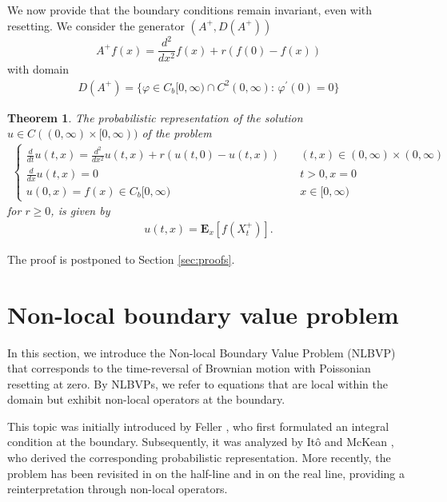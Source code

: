 \documentclass[11pt,a4paper]{article}
\newtheorem{theorem}{Theorem}
\theoremstyle{definition}
\theoremstyle{remark}
\newtheorem{remark}{Remark}
\begin{document}
We now provide that the boundary conditions remain invariant, even with resetting. We consider the generator $(A^+, {D}(A^+))$
\[
A^+f(x)= \frac{d^2}{dx^2} f(x) + r (f(0) - f(x))\]
with domain
\begin{align}
	\label{DomA}
	{D}(A^+)=\big\{\varphi \in C_b[0,\infty) \cap C^2(0,\infty):\, \varphi^\prime (0)=0 \big\}
\end{align}
\begin{theorem}
	\label{thm:resetting-refl}
	The probabilistic representation of the solution $u \in C((0,\infty) \times [0,\infty))$ of the problem
	\begin{align*}
		\begin{cases}
			\frac{d}{d t} u(t,x)=\frac{d^2}{dx^2} u(t,x) + r (u(t,0) - u(t,x)) \quad &(t,x) \in (0,\infty) \times (0,\infty) \\
			\frac{d}{dx} u(t,x) = 0 \quad    &t>0, x=0\\
			u(0,x) =f(x) \in C_b[0,\infty) \quad &x \in [0,\infty)
		\end{cases}
	\end{align*}
	for $r\geq 0$, is given by
	\begin{align*}
		u(t,x)=\mathbf{E}_x[f (X_t^+)].
	\end{align*}
\end{theorem}
\noindent
The proof is postponed to Section \ref{sec:proofs}.
\section{Non-local boundary value problem}
In this section, we introduce the Non-local Boundary Value Problem (NLBVP) that corresponds to the time-reversal of Brownian motion with Poissonian resetting at zero. By NLBVPs, we refer to equations that are local within the domain but exhibit non-local operators at the boundary.  

This topic was initially introduced by Feller \cite{feller}, who first formulated an integral condition at the boundary. Subsequently, it was analyzed by It\^o and McKean \cite{ItoMckean}, who derived the corresponding probabilistic representation. More recently, the problem has been revisited in \cite{boncoldovpag2024} on the half-line and in \cite{colantoni2023non} on the real line, providing a reinterpretation through non-local operators.  
\end{document}
